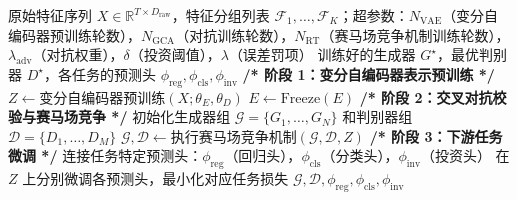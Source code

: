 \begin{algorithm}[H]
\caption{高维因子建模框架总体训练流程}
\label{alg:highdim_overall}
\begin{algorithmic}[0]
\Require 原始特征序列 $X \in \mathbb{R}^{T \times D_{\text{raw}}}$，特征分组列表 $\mathcal{F}_1, \ldots, \mathcal{F}_K$；超参数：$N_{\text{VAE}}$（变分自编码器预训练轮数），$N_{\text{GCA}}$（对抗训练轮数），$N_{\text{RT}}$（赛马场竞争机制训练轮数），$\lambda_{\text{adv}}$（对抗权重），$\delta$（投资阈值），$\lambda$（误差罚项）
\Ensure 训练好的生成器 $G^{\star}$，最优判别器 $D^{\star}$，各任务的预测头 $\phi_{\text{reg}}, \phi_{\text{cls}}, \phi_{\text{inv}}$
\Statex
\State \textbf{/* 阶段 1：变分自编码器表示预训练 */}
\State $Z \leftarrow \text{变分自编码器预训练}(X; \theta_E, \theta_D)$ 
\State $E \leftarrow \text{Freeze}(E)$ 
\Statex
\State \textbf{/* 阶段 2：交叉对抗校验与赛马场竞争 */}
\State 初始化生成器组 $\mathcal{G} = \{G_1, \ldots, G_N\}$ 和判别器组 $\mathcal{D} = \{D_1, \ldots, D_M\}$
\State $\mathcal{G}, \mathcal{D} \leftarrow \text{执行赛马场竞争机制}(\mathcal{G}, \mathcal{D}, Z)$ 
\Statex
\State \textbf{/* 阶段 3：下游任务微调 */}
\State 连接任务特定预测头：$\phi_{\text{reg}}$（回归头），$\phi_{\text{cls}}$（分类头），$\phi_{\text{inv}}$（投资头）
\State 在 $Z$ 上分别微调各预测头，最小化对应任务损失
\Statex
\State \Return $\mathcal{G}, \mathcal{D}, \phi_{\text{reg}}, \phi_{\text{cls}}, \phi_{\text{inv}}$
\end{algorithmic}
\end{algorithm}

